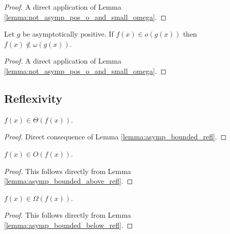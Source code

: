 \begin{proof}
    \leanok
    A direct application of Lemma \ref{lemma:not_asymp_pos_o_and_small_omega}.
\end{proof}

\begin{lemma}
    \label{lemma:not_asymp_pos_o_of_small_omega}
    \leanok
    Let $g$ be asymptotically positive. If $f(x) \in o(g(x))$ then $f(x) \notin \omega(g(x))$.
\end{lemma}

\begin{proof}
    \leanok
    A direct application of Lemma \ref{lemma:not_asymp_pos_o_and_small_omega}.
\end{proof}


\subsection{Reflexivity}

\begin{lemma}
    \label{lemma:theta_refl}
    \leanok
    $f(x) \in \Theta(f(x))$.

\end{lemma}

\begin{proof}
    \leanok
    Direct consequence of Lemma \ref{lemma:asymp_bounded_refl}.
\end{proof}

\begin{lemma}
    \label{lemma:O_refl}
    \leanok
    $f(x) \in O(f(x))$.
\end{lemma}

\begin{proof}
    \leanok
    This follows directly from Lemma \ref{lemma:asymp_bounded_above_refl}.
\end{proof}

\begin{lemma}
    \label{lemma:Omega_refl}
    \leanok
    $f(x) \in \Omega(f(x))$.
\end{lemma}

\begin{proof}
    \leanok
    This follows directly from Lemma \ref{lemma:asymp_bounded_below_refl}.
\end{proof}


